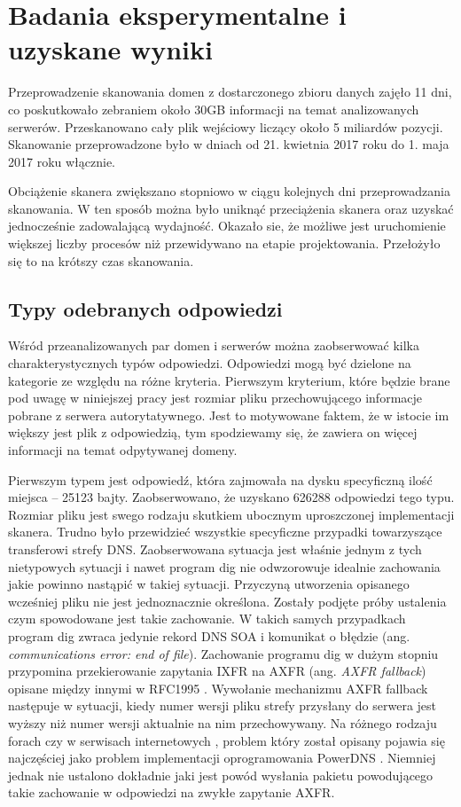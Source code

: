 \chapter{Badania eksperymentalne i uzyskane wyniki}
Przeprowadzenie skanowania domen z dostarczonego zbioru danych zajęło 11 dni, co poskutkowało zebraniem około 30GB informacji na
temat analizowanych serwerów. Przeskanowano cały plik wejściowy liczący około 5 miliardów pozycji. Skanowanie przeprowadzone było
w dniach od 21. kwietnia 2017 roku do 1. maja 2017 roku włącznie.

Obciążenie skanera zwiększano stopniowo w ciągu kolejnych dni przeprowadzania skanowania. W ten sposób można było uniknąć przeciążenia
skanera oraz uzyskać jednocześnie zadowalającą wydajność. Okazało sie, że możliwe jest uruchomienie większej liczby procesów niż
przewidywano na etapie projektowania. Przełożyło się to na krótszy czas skanowania.

\section{Typy odebranych odpowiedzi}\label{sec:typy}
Wśród przeanalizowanych par domen i serwerów można zaobserwować kilka charakterystycznych typów odpowiedzi. Odpowiedzi mogą być
dzielone na kategorie ze względu na różne kryteria. Pierwszym kryterium, które będzie brane pod uwagę w niniejszej pracy jest
rozmiar pliku przechowującego informacje pobrane z serwera autorytatywnego. Jest to motywowane faktem, że w istocie im większy
jest plik z odpowiedzią, tym spodziewamy się, że zawiera on więcej informacji na temat odpytywanej domeny.

Pierwszym typem jest odpowiedź, która zajmowała na dysku specyficzną ilość miejsca -- 25123 bajty. Zaobserwowano, że uzyskano
626288 odpowiedzi tego typu. Rozmiar pliku jest swego rodzaju skutkiem ubocznym uproszczonej implementacji skanera. Trudno było
przewidzieć wszystkie specyficzne przypadki towarzyszące transferowi strefy DNS. Zaobserwowana sytuacja jest właśnie jednym z
tych nietypowych sytuacji i nawet program dig nie odwzorowuje idealnie zachowania jakie powinno nastąpić w takiej sytuacji.
Przyczyną utworzenia opisanego wcześniej pliku nie jest jednoznacznie określona. Zostały podjęte próby ustalenia czym spowodowane
	jest takie zachowanie. W takich samych przypadkach program dig zwraca jedynie rekord DNS SOA i komunikat o błędzie (ang.
\textit{communications error: end of file}). Zachowanie programu dig w dużym stopniu przypomina przekierowanie zapytania IXFR na
AXFR (ang. \textit{AXFR fallback}) opisane między innymi w RFC1995 \cite{RFC1995}. Wywołanie mechanizmu AXFR fallback następuje
w sytuacji, kiedy numer wersji pliku strefy przysłany do serwera jest wyższy niż numer wersji aktualnie na nim przechowywany.
Na różnego rodzaju forach \cite{powerdns-forum} czy w serwisach internetowych \cite{powerdns-git}, problem który został opisany
pojawia się najczęściej jako problem implementacji oprogramowania PowerDNS \cite{powerdns}. Niemniej jednak nie ustalono dokładnie
jaki jest powód wysłania pakietu powodującego takie zachowanie w odpowiedzi na zwykłe zapytanie AXFR.

